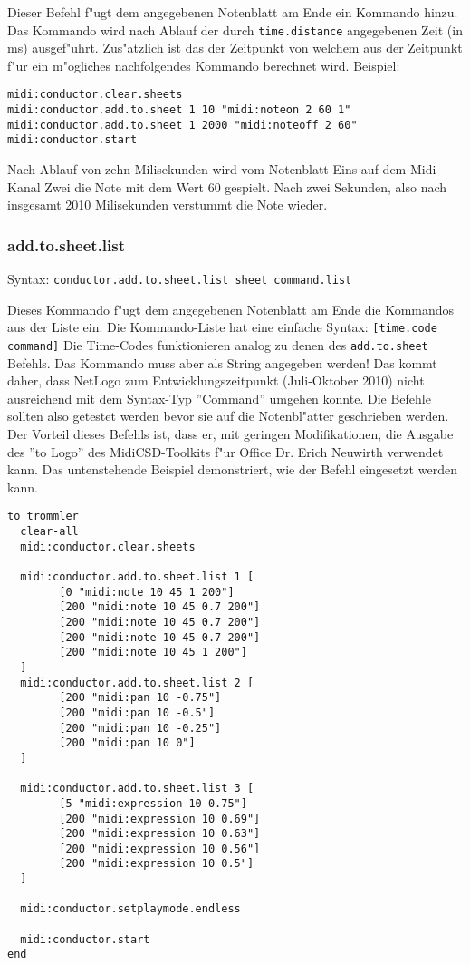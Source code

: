 Dieser Befehl f"ugt dem angegebenen Notenblatt am Ende ein Kommando hinzu. Das
Kommando wird nach Ablauf der durch \lstinline|time.distance| angegebenen Zeit
(in ms) ausgef"uhrt. Zus"atzlich ist das der Zeitpunkt von welchem aus der 
Zeitpunkt f"ur ein m"ogliches nachfolgendes Kommando berechnet wird. Beispiel:
\begin{lstlisting}[language=Logo]
midi:conductor.clear.sheets
midi:conductor.add.to.sheet 1 10 "midi:noteon 2 60 1"
midi:conductor.add.to.sheet 1 2000 "midi:noteoff 2 60"
midi:conductor.start
\end{lstlisting}
Nach Ablauf von zehn Milisekunden wird vom Notenblatt Eins auf dem Midi-Kanal
Zwei die Note mit dem Wert 60 gespielt. Nach zwei Sekunden, also nach insgesamt
2010 Milisekunden verstummt die Note wieder. 

\subsubsection{add.to.sheet.list}
Syntax: \lstinline|conductor.add.to.sheet.list sheet command.list|

Dieses Kommando f"ugt dem angegebenen Notenblatt am Ende die Kommandos aus der 
Liste ein. Die Kommando-Liste hat eine einfache Syntax: \lstinline|[time.code command]|
Die Time-Codes funktionieren analog zu denen des \lstinline|add.to.sheet| Befehls.
Das Kommando muss aber als String angegeben werden! Das kommt daher, dass NetLogo
zum Entwicklungszeitpunkt (Juli-Oktober 2010) nicht ausreichend mit dem Syntax-Typ
''Command'' umgehen konnte. Die Befehle sollten also getestet werden bevor sie
auf die Notenbl"atter geschrieben werden. Der Vorteil dieses Befehls ist, dass
er, mit geringen Modifikationen, die Ausgabe des ''to Logo'' des MidiCSD-Toolkits \cite{MidiCSD}
f"ur Office Dr. Erich Neuwirth verwendet kann. Das untenstehende Beispiel demonstriert,
wie der Befehl eingesetzt werden kann. 
\begin{lstlisting}[language=Logo]
to trommler
  clear-all
  midi:conductor.clear.sheets
 
  midi:conductor.add.to.sheet.list 1 [
		[0 "midi:note 10 45 1 200"]
		[200 "midi:note 10 45 0.7 200"]
		[200 "midi:note 10 45 0.7 200"]
		[200 "midi:note 10 45 0.7 200"]
		[200 "midi:note 10 45 1 200"]
  ]
  midi:conductor.add.to.sheet.list 2 [
		[200 "midi:pan 10 -0.75"]
		[200 "midi:pan 10 -0.5"]
		[200 "midi:pan 10 -0.25"]
		[200 "midi:pan 10 0"]
  ]
  
  midi:conductor.add.to.sheet.list 3 [
		[5 "midi:expression 10 0.75"]
		[200 "midi:expression 10 0.69"]
		[200 "midi:expression 10 0.63"]
		[200 "midi:expression 10 0.56"]
		[200 "midi:expression 10 0.5"]
  ]
  
  midi:conductor.setplaymode.endless

  midi:conductor.start
end
\end{lstlisting}

